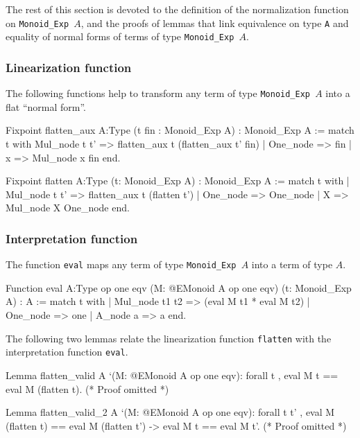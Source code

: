 The rest of this section is devoted to the definition of the normalization 
function on \texttt{Monoid\_Exp $A$}, and the proofs of lemmas that
link equivalence on type \texttt{A} and equality of normal forms
of terms of type \texttt{Monoid\_Exp $A$}.


\subsubsection{Linearization function}

The following functions help to transform any term of type
\texttt{Monoid\_Exp $A$} into a flat ``normal form''.

\begin{Coqsrc}

Fixpoint flatten_aux {A:Type} (t fin : Monoid_Exp A) 
  : Monoid_Exp A :=
match t with Mul_node  t t' =>
              flatten_aux t (flatten_aux t' fin)
           | One_node  => fin
           |  x => Mul_node  x fin
end.

Fixpoint flatten {A:Type} (t: Monoid_Exp A) : Monoid_Exp A :=
match t with
| Mul_node t t' => flatten_aux t (flatten t')
| One_node => One_node
| X => Mul_node X One_node
end.
\end{Coqsrc}

\subsubsection{Interpretation function}

The function \texttt{eval} maps any term of type \texttt{Monoid\_Exp $A$}
into a term of type \texttt{$A$}.

\begin{Coqsrc}
Function eval {A:Type} {op one eqv}
         (M: @EMonoid A op one eqv)
         (t: Monoid_Exp A) : A :=
 match t with 
            | Mul_node t1 t2 => (eval M t1 * eval M t2)%
            | One_node => one
            | A_node a => a
end.
\end{Coqsrc}

The following two lemmas relate the linearization function \texttt{flatten}
with the interpretation function \texttt{eval}.

\begin{Coqsrc}
Lemma flatten_valid {A} `(M: @EMonoid A op one eqv):
forall t , eval M t == eval M (flatten t).
(* Proof omitted *) 

Lemma flatten_valid_2 {A} `(M: @EMonoid A op one eqv):
forall t t' , eval  M (flatten t) == eval M (flatten t')  ->
     eval M t == eval M t'.
(* Proof omitted *)
\end{Coqsrc}

